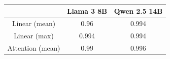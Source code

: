 
\begin{tabular}{ccc}
\toprule
 &
\textbf{Llama 3 8B} &
\textbf{Qwen 2.5 14B} \\
\midrule

Linear (mean)    & 0.96 & 0.994  \\
Linear (max)     & 0.994 & 0.994 \\
Attention (mean) & 0.99 & 0.996 \\

\bottomrule
\end{tabular}